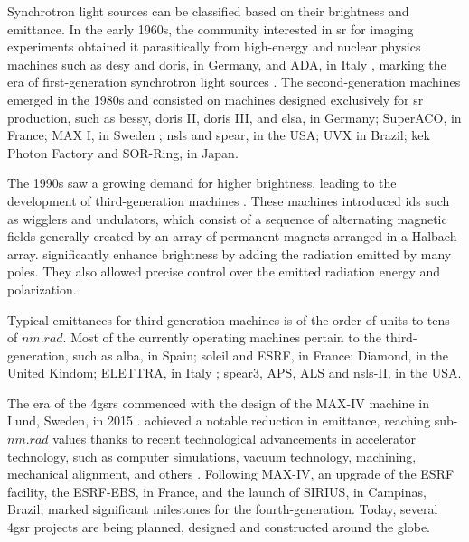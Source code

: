 Synchrotron light sources can be classified based on their brightness and emittance. In the early 1960s, the community interested in \gls*{sr} for imaging experiments obtained it parasitically from high-energy and nuclear physics machines such as \acrshort*{desy} and \acrshort*{doris}, in Germany, and ADA, in Italy \cite{simoulin_synchrotron_2016}, marking the era of first-generation synchrotron light sources \cite{liu_towards_2017}. The second-generation machines emerged in the 1980s and consisted on machines designed exclusively for \gls*{sr} production, such as \acrshort*{bessy}, \acrshort*{doris} II, \acrshort*{doris} III, and \acrshort*{elsa}, in Germany; \gls*{SuperACO}, in France; MAX I, in Sweden \cite{simoulin_synchrotron_2016}; \acrshort*{nsls} and \acrshort*{spear}, in the USA; \gls*{UVX} in Brazil; \gls*{kek} Photon Factory and \gls*{SOR-Ring}, in Japan.

The 1990s saw a growing demand for higher brightness, leading to the development of third-generation machines \cite{liu_towards_2017}. These machines introduced \glspl*{id} such as wigglers and undulators, which consist of a sequence of alternating magnetic fields generally created by an array of permanent magnets arranged in a Halbach array.  significantly enhance brightness by adding the radiation emitted by many poles. They also allowed precise control over the emitted radiation energy and polarization.

Typical emittances for third-generation machines is of the order of units to tens of $\unit{nm}.\unit{rad}$. Most of the currently operating machines pertain to the third-generation, such as \gls*{alba}, in Spain; \acrshort*{soleil} and \acrshort*{ESRF}, in France; Diamond, in the United Kindom; \gls*{ELETTRA}, in Italy \cite{simoulin_synchrotron_2016}; \acrshort*{spear}3, \acrshort*{APS}, \acrshort*{ALS} and \acrshort*{nsls}-II, in the USA.

The era of the \glspl*{4gsr} commenced with the design of the MAX-IV machine in Lund, Sweden, in 2015 \cite{liu_towards_2017,hettel_challenges_2014}.  achieved a notable reduction in emittance, reaching sub-$\unit{nm}.\unit{rad}$ values thanks to recent technological advancements in accelerator technology, such as computer simulations, vacuum technology, machining, mechanical alignment, and others  \cite{hettel_challenges_2014,liu_towards_2017}. Following MAX-IV, an upgrade of the \acrshort*{ESRF} facility, the ESRF-EBS, in France, and the launch of SIRIUS, in Campinas, Brazil, marked significant milestones for the fourth-generation. Today, several \gls*{4gsr} projects are being planned, designed and constructed around the globe.

